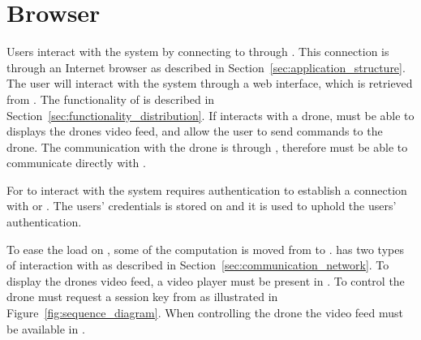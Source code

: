 \section{Browser}
\label{sec:design_client}
Users interact with the system by connecting to  through .
This connection is through an Internet browser as described in Section~\ref{sec:application_structure}.
The user will interact with the system through a web interface, which is retrieved from .
The functionality of  is described in Section~\ref{sec:functionality_distribution}.
If  interacts with a drone,  must be able to displays the drones video feed, and allow the user to send commands to the drone.
The communication with the drone is through , therefore  must be able to communicate directly with .

For  to interact with the system requires authentication to establish a connection with  or .%
The users' credentials is stored on  and it is used to uphold the users' authentication.

To ease the load on , some of the computation is moved from  to .
 has two types of interaction with  as described in Section~\ref{sec:communication_network}.
To display the drones video feed, a video player must be present in .
To control the drone  must request a session key from  as illustrated in Figure~\ref{fig:sequence_diagram}.
When controlling the drone the video feed must be available in .



